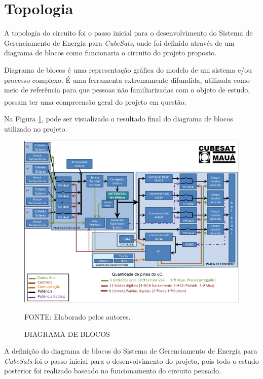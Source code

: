 \documentclass[
	12pt,				%
	openright,			%
	oneside,			%
	a4paper,			%
	english,			%
	french,				%
	spanish,			%
	brazil,				%
	oldfontcommands
	]{abntex2}
\begin{document}
\section[Topologia]{Topologia}

	A topologia do circuito foi o passo inicial para o desenvolvimento do Sistema de Gerenciamento de Energia para \textit{CubeSats}, onde foi definido através de um diagrama de blocos como funcionaria o circuito do projeto proposto.
	
	Diagrama de blocos é uma representação gráfica do modelo de um sistema e/ou processo complexo. É uma ferramenta extremamente difundida, utilizada como meio de referência para que pessoas não familiarizadas com o objeto de estudo, possam ter uma compreensão geral do projeto em questão.\textsuperscript{\cite{Diag_Blocos}}	
		
	Na Figura \ref{Fig_Diag_Blocos_Final}, pode ser visualizado o resultado final do diagrama de blocos utilizado no projeto.
	
	\begin{figure}[th]
		\caption{DIAGRAMA DE BLOCOS}
		\label{Fig_Diag_Blocos_Final}
		\centering
		\includegraphics[width=1.0\linewidth]{./figs/diag_blocos}
			
		\begin{small}
			FONTE: Elaborado pelos autores.
		\end{small}		
	\end{figure}
	\pagebreak
	
	A definição do diagrama de blocos do Sistema de Gerenciamento de Energia para \textit{CubeSats} foi o passo inicial para o desenvolvimento do projeto, pois todo o estudo posterior foi realizado baseado no funcionamento do circuito pensado.
\end{document}
